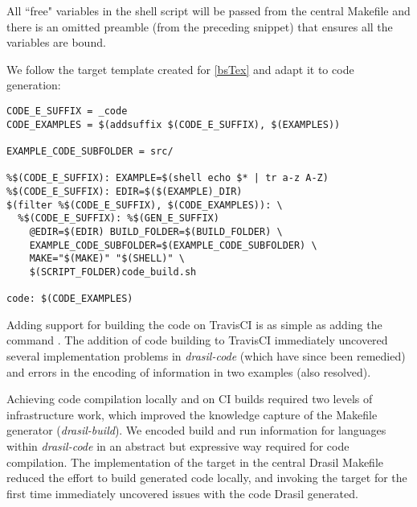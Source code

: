 {{{{{All ``free" variables in the shell script will be passed from the central Makefile and there is an omitted preamble (from the preceding snippet) that ensures all the variables are bound. 

We follow the target template created for \autoref{bsTex} and adapt it to code generation:

\begin{tcolorbox}[breakable, toprule at break=0pt, bottomrule at break=0pt]
\begin{verbatim}
CODE_E_SUFFIX = _code
CODE_EXAMPLES = $(addsuffix $(CODE_E_SUFFIX), $(EXAMPLES))

EXAMPLE_CODE_SUBFOLDER = src/

%$(CODE_E_SUFFIX): EXAMPLE=$(shell echo $* | tr a-z A-Z)
%$(CODE_E_SUFFIX): EDIR=$($(EXAMPLE)_DIR)
$(filter %$(CODE_E_SUFFIX), $(CODE_EXAMPLES)): \
  %$(CODE_E_SUFFIX): %$(GEN_E_SUFFIX)
	@EDIR=$(EDIR) BUILD_FOLDER=$(BUILD_FOLDER) \
	EXAMPLE_CODE_SUBFOLDER=$(EXAMPLE_CODE_SUBFOLDER) \
	MAKE="$(MAKE)" "$(SHELL)" \
	$(SCRIPT_FOLDER)code_build.sh

code: $(CODE_EXAMPLES)
\end{verbatim}
\end{tcolorbox}

Adding support for building the code on TravisCI is as simple as adding the command . The addition of code building to TravisCI immediately uncovered several implementation problems in \textit{drasil-code} (which have since been remedied) and errors in the encoding of information in two examples (also resolved).

Achieving code compilation locally and on CI builds required two levels of infrastructure work, which improved the knowledge capture of the Makefile generator (\textit{drasil-build}). We encoded build and run information for languages within \textit{drasil-code} in an abstract but expressive way required for code compilation. The implementation of the  target in the central Drasil Makefile reduced the effort to build generated code locally, and invoking the target for the first time immediately uncovered issues with the code Drasil generated.

}}}}}
